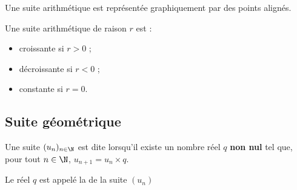 \documentclass[10pt,openright,twoside,french]{book}
\begin{document}
\begin{Prop}
    Une suite arithmétique est représentée graphiquement par des points alignés.
\end{Prop}\medskip

\begin{Thm}
    Une suite arithmétique de raison $r$ est :
    \begin{itemize}
        \item croissante si $r > 0$ ;
        \item décroissante si $r < 0$ ;
        \item constante si $r = 0$.
    \end{itemize}
\end{Thm}

\subsection{Suite géométrique}

\begin{Defi}
    Une suite $(u_n)_{n\in \N}$ est dite   lorsqu'il existe un nombre réel $q$ \textbf{non nul} tel que, pour tout $n \in \N$, $u_{n+1} = u_n \times q$.\par
    Le réel $q$ est appelé la  de la suite $(u_n)$
\end{Defi}\medskip
\end{document}
